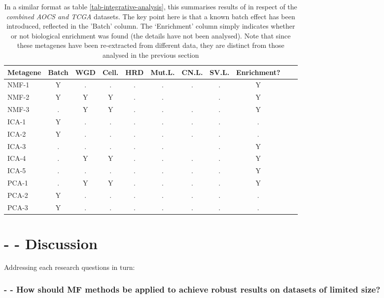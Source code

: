 \documentclass[tikz, 11pt,a4paper,oneside,fleqn, draft]{article}
\begin{document}
\begin{table}[htb!]
\begin{center}
\begingroup
\scriptsize
\renewcommand{\arraystretch}{1.4} %
\begin{tabular}{|l||c|c|c|c|c|c|c|c|l|l|}
\hline
Metagene & Batch & WGD & Cell. & HRD & Mut.L. & CN.L. & SV.L. & Enrichment? \\
\hline
NMF-1 & Y & . & . & . & . & . & . &  Y \\
NMF-2 & Y & Y & Y & . & . &   & . &  Y \\
NMF-3 & . & Y & Y & . & . & . & . &  Y \\
\hline
ICA-1 & Y & . & . & . & . & . & . &  . \\
ICA-2 & Y & . & . & . & . & . & . &  . \\
ICA-3 & . & . & . & . & . &   & . &  Y \\
ICA-4 & . & Y & Y & . & . & . & . &  Y \\
ICA-5 & . & . & . & . & . & . & . &  Y \\
\hline
PCA-1 & . & Y & Y & . & . & . & . &  Y \\
PCA-2 & Y & . & . & . & . & . & . &  . \\
PCA-3 & Y & . & . & . & . & . & . &  . \\
\hline
\end{tabular}
\endgroup
\end{center}
\caption{In a similar format as table \ref{tab-integrative-analysis}, this summarises results of in respect of the \emph{combined AOCS and TCGA} datasets.  The key point here is that a known batch effect has been introduced, reflected in the 'Batch' column.  The `Enrichment' column simply indicates whether or not biological enrichment was found (the details have not been analysed).   Note that since these metagenes have been re-extracted from different data, they are distinct from those analysed in the previous section}
\label{tab-integrative-analysis-BOTH}
\end{table}

\clearpage

\section{- - Discussion}

Addressing each research questions in turn:




\subsubsection*{- - How should MF methods be applied to achieve robust results on datasets of limited size?}
\end{document}
